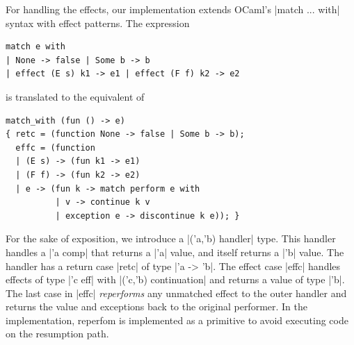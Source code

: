 \documentclass[sigplan,10pt,review,anonymous]{acmart}\settopmatter{printfolios=true,printccs=false,printacmref=false}
\begin{document}
For handling the effects, our implementation extends OCaml's |match ... with|
syntax with effect patterns. The expression
\begin{lstlisting}
match e with
| None -> false | Some b -> b
| effect (E s) k1 -> e1 | effect (F f) k2 -> e2
\end{lstlisting}
\noindent is translated to the equivalent of
\begin{lstlisting}
match_with (fun () -> e)
{ retc = (function None -> false | Some b -> b);
  effc = (function
  | (E s) -> (fun k1 -> e1)
  | (F f) -> (fun k2 -> e2)
  | e -> (fun k -> match perform e with
          | v -> continue k v
          | exception e -> discontinue k e)); }
\end{lstlisting}
For the sake of exposition, we introduce a |('a,'b) handler| type. This handler
handles a |'a comp| that returns a |'a| value, and itself returns a |'b| value.
The handler has a return case |retc| of type |'a -> 'b|. The effect case |effc|
handles effects of type |'c eff| with |('c,'b) continuation| and returns a
value of type |'b|. The last case in |effc| \emph{reperforms} any unmatched
effect to the outer handler and returns the value and exceptions back to the
original performer. In the implementation, reperfom is implemented as a
primitive to avoid executing code on the resumption path.
\end{document}
